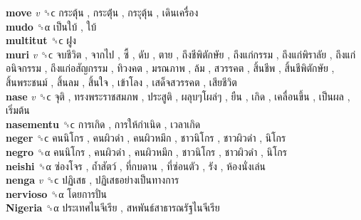 \textbf{move} \emph{v}  ␝ϲ   กระตุ้น ,  กระตุ้่น ,  กระุตุ้น ,  เดินเครื่อง   \\
\textbf{mudo} ␝α   เป็นใบ้ ,  ใบ้   \\
\textbf{multitut} ␝ϲ   ฝูง   \\
\textbf{muri} \emph{v}  ␝ϲ   จบชีวิต ,  จากไป ,  ซี้ ,  ดับ ,  ตาย ,  ถึงชีพิตักษัย ,  ถึงแก่กรรม ,  ถึงแก่พิราลัย ,  ถึงแก่อนิจกรรม ,  ถึงแก่อสัญกรรม ,  ทิวงคต ,  มรณภาพ ,  ล้ม ,  สวรรคต ,  สิ้นชีพ ,  สิ้นชีพิตักษัย ,  สิ้นพระชนม์ ,  สิ้นลม ,  สิ้นใจ ,  เข้าโลง ,  เสด็จสวรรคต ,  เสียชีวิต   \\
\textbf{nase} \emph{v}  ␝ϲ   จุติ ,  ทรงพระราชสมภพ ,  ประสูติ ,  ผลุบๆโผล่ๆ ,  ยืน ,  เกิด ,  เคลื่อนขึ้น ,  เป็นผล ,  เริ่มต้น   \\
\textbf{nasementu} ␝ϲ   การเกิด ,  การให้กำเนิด ,  เวลาเกิด   \\
\textbf{neger} ␝ϲ   คนนิโกร ,  คนผิวดำ ,  คนผิวหมึก ,  ชาวนิโกร ,  ชาวผิวดำ ,  นิโกร   \\
\textbf{negro} ␝α   คนนิโกร ,  คนผิวดำ ,  คนผิวหมึก ,  ชาวนิโกร ,  ชาวผิวดำ ,  นิโกร   \\
\textbf{neishi} ␝α   ซ่องโจร ,  ถ้ำสัตว์ ,  ที่กบดาน ,  ที่ซ่อนตัว ,  รัง ,  ห้องนั่งเล่น   \\
\textbf{nenga} \emph{v}  ␝ϲ   ปฏิเสธ ,  ปฏิเสธอย่างเป็นทางการ   \\
\textbf{nervioso} ␝α   โดยการปั่น   \\
\textbf{Nigeria} ␝α   ประเทศไนจีเรีย ,  สหพันธ์สาธารณรัฐไนจีเรีย   \\
